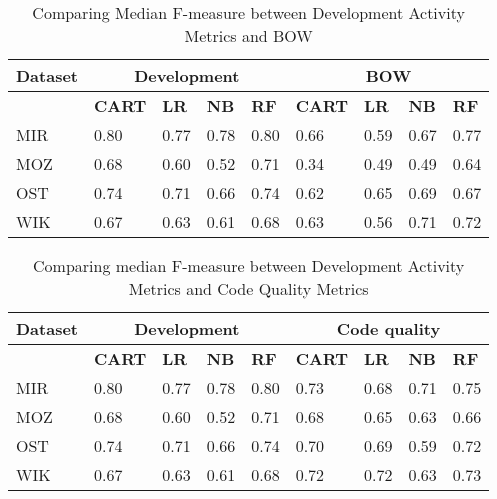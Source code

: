\documentclass[smallextended]{svjour3}       %
\begin{document}
\begin{table*}[]
\centering
\caption{Comparing Median F-measure between Development Activity Metrics and BOW}
\label{res:rq1:table:f1:bow}
\footnotesize{  
\begin{tabular}{p{1.2cm} p{0.9cm} p{0.9cm} p{0.9cm} p{0.9cm} p{0.9cm} p{0.6cm} p{0.6cm} p{0.6cm}  }
\hline
\textbf{Dataset} & \multicolumn{4}{c}{\textbf{Development}} & \multicolumn{4}{c}{\textbf{BOW}}  \\
\hline
 &  \textbf{CART} & \textbf{LR} & \textbf{NB} & \textbf{RF} & \textbf{CART} & \textbf{LR} & \textbf{NB} & \textbf{RF} \\
\hline
MIR & \cellcolor{lightgray} 0.80 & 0.77 & 0.78 & \cellcolor{lightgray} 0.80 & 0.66 & 0.59 & 0.67 & 0.77    \\
MOZ & 0.68                       & 0.60 & 0.52 & \cellcolor{lightgray} 0.71 & 0.34 & 0.49 & 0.49 & 0.64   \\
OST & \cellcolor{lightgray} 0.74 & 0.71 & 0.66 & \cellcolor{lightgray} 0.74 & 0.62 & 0.65 & 0.69 & 0.67  \\
WIK & 0.67                       & 0.63 & 0.61 & 0.68                       & 0.63 & 0.56 & 0.71 & \cellcolor{lightgray} 0.72  \\
\hline
\end{tabular}
}
\end{table*}  

\begin{table*}[]
\centering
\caption{Comparing median F-measure between Development Activity Metrics and Code Quality Metrics}
\label{res:rq1:table:f1:code}
\footnotesize{  
\begin{tabular}{p{1.2cm} p{0.9cm} p{0.9cm} p{0.9cm} p{0.9cm} p{0.9cm} p{0.6cm} p{0.6cm} p{0.6cm}  }
\hline
\textbf{Dataset} & \multicolumn{4}{c}{\textbf{Development}} & \multicolumn{4}{c}{\textbf{Code quality}}  \\
\hline
 &  \textbf{CART} & \textbf{LR} & \textbf{NB} & \textbf{RF} & \textbf{CART} & \textbf{LR} & \textbf{NB} & \textbf{RF} \\
\hline
MIR & \cellcolor{lightgray} 0.80 & 0.77 & 0.78 & \cellcolor{lightgray} 0.80 & 0.73 & 0.68 & 0.71 & 0.75   \\
MOZ & 0.68                       & 0.60 & 0.52 & \cellcolor{lightgray} 0.71 & 0.68 & 0.65 & 0.63 & 0.66   \\
OST & \cellcolor{lightgray} 0.74 & 0.71 & 0.66 & \cellcolor{lightgray} 0.74 & 0.70 & 0.69 & 0.59 & 0.72   \\
WIK & 0.67 & 0.63 & 0.61 & 0.68                                             & 0.72 & 0.72 & 0.63 & \cellcolor{lightgray}  0.73   \\
\hline
\end{tabular}
}
\end{table*}  
\end{document}
